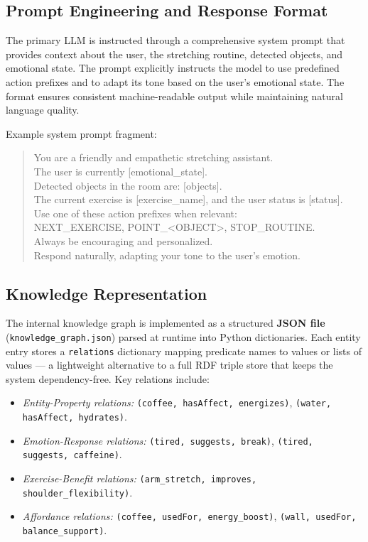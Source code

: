 \subsection{Prompt Engineering and Response Format}

The primary LLM is instructed through a comprehensive system prompt that provides context about the user, the stretching routine, detected objects, and emotional state. The prompt explicitly instructs the model to use predefined action prefixes and to adapt its tone based on the user's emotional state. The format ensures consistent machine-readable output while maintaining natural language quality.

Example system prompt fragment:
\begin{quote}
\small\ttfamily
You are a friendly and empathetic stretching assistant.\\
The user is currently [emotional\_state].\\
Detected objects in the room are: [objects].\\
The current exercise is [exercise\_name], and the user status is [status].\\
Use one of these action prefixes when relevant:\\
NEXT\_EXERCISE, POINT\_<OBJECT>, STOP\_ROUTINE.\\
Always be encouraging and personalized.\\
Respond naturally, adapting your tone to the user's emotion.
\end{quote}

\subsection{Knowledge Representation}

The internal knowledge graph is implemented as a structured \textbf{JSON file} (\texttt{knowledge\_graph.json}) parsed at runtime into Python dictionaries. Each entity entry stores a \texttt{relations} dictionary mapping predicate names to values or lists of values — a lightweight alternative to a full RDF triple store that keeps the system dependency-free. Key relations include:

\begin{itemize}
\item \textit{Entity-Property relations:} \texttt{(coffee, hasAffect, energizes)}, \texttt{(water, hasAffect, hydrates)}.
\item \textit{Emotion-Response relations:} \texttt{(tired, suggests, break)}, \texttt{(tired, suggests, caffeine)}.
\item \textit{Exercise-Benefit relations:} \texttt{(arm\_stretch, improves, shoulder\_flexibility)}.
\item \textit{Affordance relations:} \texttt{(coffee, usedFor, energy\_boost)}, \texttt{(wall, usedFor, balance\_support)}.
\end{itemize}

